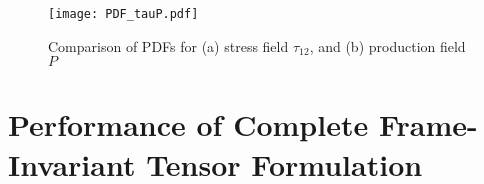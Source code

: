 


%
\begin{figure}
	\centering \hspace{-1.75cm}
	\texttt{[image: PDF\_tauP.pdf]}
	\caption{Comparison of PDFs for (a) stress field $\tau_{12}$, and (b) production field $P$}
	\label{F:Smith_PDF}
\end{figure}
%
%


\section{Performance of Complete Frame-Invariant Tensor Formulation} 
\label{sec:10C}



